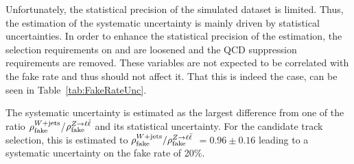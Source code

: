 Unfortunately, the statistical precision of the simulated \WJets dataset is limited.
Thus, the estimation of the systematic uncertainty is mainly driven by statistical uncertainties.
In order to enhance the statistical precision of the estimation, the selection requirements on \met and \ptfirstjet are loosened and the QCD suppression requirements are removed.
These variables are not expected to be correlated with the fake rate and thus should not affect it.
That this is indeed the case, can be seen in Table~\ref{tab:FakeRateUnc}.

\renewcommand{\arraystretch}{1.5}
\begin{table}[!h]
\centering
\caption{Fake rates in simulated \WJets and \ZlepJets events for different event-based selections of the \WJets sample. The track-based selection is the candidate track selection from Table~\ref{tab:SummaryCuts}.}
\label{tab:FakeRateUnc}
\end{table}

The systematic uncertainty is estimated as the largest difference from one of the ratio $\rho_{\text{fake}}^{W+\text{jets}}$/$\rho_{\text{fake}}^{Z\rightarrow\ell\bar{\ell}}$ and its statistical uncertainty.
For the candidate track selection, this is estimated to $\rho_{\text{fake}}^{W+\text{jets}}/\rho_{\text{fake}}^{Z\rightarrow\ell\bar{\ell}}$ $ =  0.96 \pm 0.16 $ leading to a systematic uncertainty on the fake rate of 20\%.
